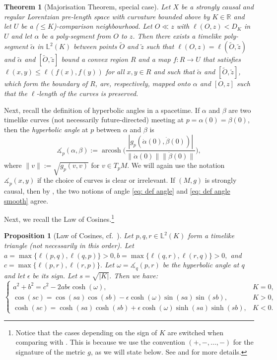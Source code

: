 \documentclass[hidelinks,12pt,a4paper]{article}
\numberwithin{equation}{section}
\theoremstyle{plain}
\newtheorem{theorem}[definition]{Theorem}
\newtheorem{proposition}[definition]{Proposition}
\theoremstyle{definition}
\newcommand{\R}{\mathbb R}
\DeclareMathOperator{\arcosh}{arcosh}
\newcommand{\lm}[1]{\mathbb{L}^2(#1)}
\newcommand{\LpLS}{Lo\-rentz\-ian pre-length space }
\newcommand{\ma}{\ensuremath{\measuredangle}}
\begin{document}
\begin{theorem}[Majorisation Theorem, special case]
\label{thm: majorisation}
Let $X$ be a strongly causal and regular \LpLS with curvature bounded above by $K \in \R$ and let $U$ be a ($\leq K$)-comparison neighbourhood. 
Let $O \ll z$ with $\ell(O,z)<D_K$ in $U$ and let $\alpha$ be a poly-segment from $O$ to $z$. 
Then there exists a timelike poly-segment $\tilde \alpha$ in $\lm K$ between points $\tilde O$ and $\tilde z$ such that $\ell(O,z)=\ell(\tilde O, \tilde z)$ and $\tilde \alpha$ and $[\tilde O, \tilde z]$ bound a convex region $R$ and a map $f\colon R \to U$ that satisfies $\ell(x,y) \leq \ell(f(x),f(y))$ for all $x,y \in R$ and such that $\tilde \alpha$ and $[\tilde O, \tilde z]$, which form the boundary of $R$, are, respectively, mapped onto $\alpha$ and $[O,z]$ such that the $\ell$-length of the curves is preserved.
\end{theorem}

Next, recall the definition of hyperbolic angles in a spacetime. 
If $\alpha$ and $\beta$ are two timelike curves (not necessarily future-directed) meeting at $p=\alpha(0)=\beta(0)$, then the \emph{hyperbolic angle} at $p$ between $\alpha$ and $\beta$ is 
\begin{equation}
\label{eq: def angle smooth}
\ma_p(\alpha,\beta):=\arcosh{\biggl(\frac{|g_p(\dot\alpha(0),\dot\beta(0))|}{\|\dot\alpha(0)\| \|\dot\beta(0)\|}\biggr)}, 
\end{equation}
where $\|v\|:=\sqrt{g_p(v,v)}$ for $v \in T_pM$. 
We will again use the notation $\ma_p(x,y)$ if the choice of curves is clear or irrelevant. 
If $(M,g)$ is strongly causal, then by \cite[Proposition 2.13 \& Corollary 4.7]{BS23}, the two notions of angle \eqref{eq: def angle} and \eqref{eq: def angle smooth} agree. 

Next, we recall the Law of Cosines.\footnote{Notice that the cases depending on the sign of $K$ are switched when comparing with \cite{BS23}. 
This is because we use the convention $(+,-,\ldots,-)$ for the signature of the metric $g$, as we will state below. 
See \cite[Remark 2.3]{RXZ26+} and \cite[Section 2.1]{GRZ26+} for more details.}

\begin{proposition}[{Law of Cosines, cf.~\cite[Lemma~2.4 \& Remark~2.5]{BS23}}]
\label{prop: law of cosines monotonicity}
Let $p,q,r \in \mathbb{L}^2(K)$ form a timelike triangle
(not necessarily in this order). Let $a=\max\{\ell(p,q),\ell(q,p)\}>0,
b=\max\{\ell(q,r),\ell(r,q)\}>0,$ and $c=\max\{\ell(p,r),\ell(r,p)\}.$ Let $\omega=\ma_q(p,r)$ be the hyperbolic angle at $q$ and let $\epsilon$
be its sign. Let $s=\sqrt{|K|}$. Then we have:
\[
\begin{cases}
a^2+b^2=c^2-2ab\epsilon\cosh(\omega), & K=0,\\[0.4em]
\cos(sc)=\cos(sa)\cos(sb)-\epsilon\cosh(\omega)\sin(sa)\sin(sb), & K>0,\\[0.4em]
\cosh(sc)=\cosh(sa)\cosh(sb)+\epsilon\cosh(\omega)\sinh(sa)\sinh(sb), & K<0.
\end{cases}
\]
\end{proposition}
\end{document}
